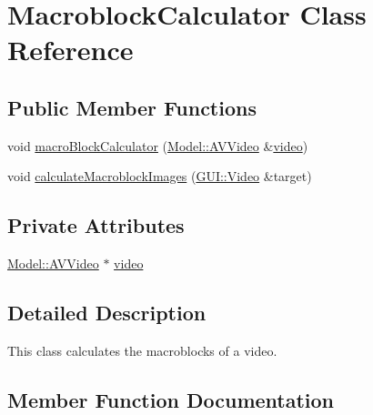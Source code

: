 \hypertarget{classUtility_1_1MacroblockCalculator}{}\section{Macroblock\+Calculator Class Reference}
\label{classUtility_1_1MacroblockCalculator}
\subsection*{Public Member Functions}
\begin{DoxyCompactItemize}
\item 
void \hyperlink{classUtility_1_1MacroblockCalculator_a64fd3d3ae21bac78ee0465eb2bd51469}{macro\+Block\+Calculator} (\hyperlink{classModel_1_1AVVideo}{Model\+::\+A\+V\+Video} \&\hyperlink{classUtility_1_1MacroblockCalculator_a9d9339a030e5aa3b959eecf241b6ffac}{video})
\item 
void \hyperlink{classUtility_1_1MacroblockCalculator_a15444a65cf4b45841e604e850a4fc231}{calculate\+Macroblock\+Images} (\hyperlink{classGUI_1_1Video}{G\+U\+I\+::\+Video} \&target)
\end{DoxyCompactItemize}
\subsection*{Private Attributes}
\begin{DoxyCompactItemize}
\item 
\hyperlink{classModel_1_1AVVideo}{Model\+::\+A\+V\+Video} $\ast$ \hyperlink{classUtility_1_1MacroblockCalculator_a9d9339a030e5aa3b959eecf241b6ffac}{video}
\end{DoxyCompactItemize}


\subsection{Detailed Description}
This class calculates the macroblocks of a video. 

\subsection{Member Function Documentation}
\hypertarget{classUtility_1_1MacroblockCalculator_a15444a65cf4b45841e604e850a4fc231}{}
